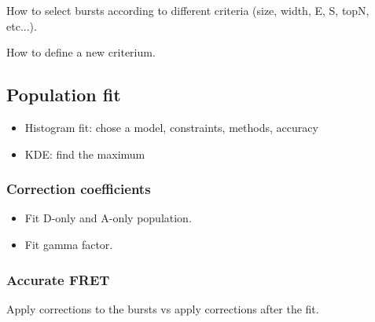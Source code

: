 How to select bursts according to different criteria (size, width, E, S, topN, etc...).

How to define a new criterium.


\subsection{Population fit}

\begin{itemize}
\item Histogram fit: chose a model, constraints, methods, accuracy
\item KDE: find the maximum
\end{itemize}

\subsubsection{Correction coefficients}

\begin{itemize}
\item Fit D-only and A-only population.
\item Fit gamma factor.
\end{itemize}


\subsubsection{Accurate FRET}

Apply corrections to the bursts vs apply corrections after the fit.


